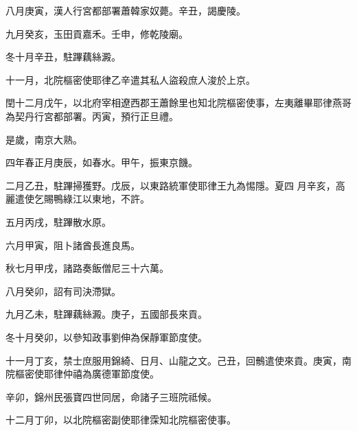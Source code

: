 \begin{pinyinscope}
 八月庚寅，漢人行宮都部署蕭韓家奴薨。辛丑，謁慶陵。



 九月癸亥，玉田貢嘉禾。壬申，修乾陵廟。



 冬十月辛丑，駐蹕藕絲澱。



 十一月，北院樞密使耶律乙辛遣其私人盜殺庶人浚於上京。



 閏十二月戊午，以北府宰相遼西郡王蕭餘里也知北院樞密使事，左夷離畢耶律燕哥為契丹行宮都部署。丙寅，預行正旦禮。



 是歲，南京大熟。



 四年春正月庚辰，如春水。甲午，振東京饑。



 二月乙丑，駐蹕掃獲野。戊辰，以東路統軍使耶律王九為惕隱。夏四
 月辛亥，高麗遣使乞賜鴨綠江以東地，不許。



 五月丙戌，駐蹕散水原。



 六月甲寅，阻卜諸酋長進良馬。



 秋七月甲戌，諸路奏飯僧尼三十六萬。



 八月癸卯，詔有司決滯獄。



 九月乙未，駐蹕藕絲澱。庚子，五國部長來貢。



 冬十月癸卯，以參知政事劉伸為保靜軍節度使。



 十一月丁亥，禁士庶服用錦綺、日月、山龍之文。己丑，回鶻遣使來貢。庚寅，南院樞密使耶律仲禧為廣德軍節度使。



 辛卯，錦州民張寶四世同居，命諸子三班院祗候。



 十二月丁卯，以北院樞密副使耶律霂知北院樞密使事。



\end{pinyinscope}